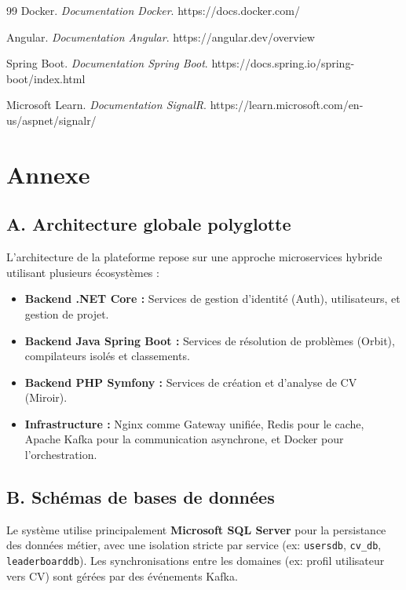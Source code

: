 \documentclass[12pt,a4paper]{report}
\newcommand{\headingfont}{}
\begin{document}
\begin{thebibliography}{99}
		 Docker. \textit{Documentation Docker}. https://docs.docker.com/
		
		 Angular. \textit{Documentation Angular}. https://angular.dev/overview
		
		 Spring Boot. \textit{Documentation Spring Boot}. https://docs.spring.io/spring-boot/index.html
		
		 Microsoft Learn. \textit{Documentation SignalR}. https://learn.microsoft.com/en-us/aspnet/signalr/
		
	\end{thebibliography}
	
    \newpage
    \chapter*{{\headingfont Annexe}}

    \section*{A. Architecture globale polyglotte}
    L'architecture de la plateforme repose sur une approche microservices hybride utilisant plusieurs écosystèmes :
    \begin{itemize}
        \item \textbf{Backend .NET Core :} Services de gestion d'identité (Auth), utilisateurs, et gestion de projet.
        \item \textbf{Backend Java Spring Boot :} Services de résolution de problèmes (Orbit), compilateurs isolés et classements.
        \item \textbf{Backend PHP Symfony :} Services de création et d'analyse de CV (Miroir).
        \item \textbf{Infrastructure :} Nginx comme Gateway unifiée, Redis pour le cache, Apache Kafka pour la communication asynchrone, et Docker pour l'orchestration.
    \end{itemize}

    \section*{B. Schémas de bases de données}
    Le système utilise principalement \textbf{Microsoft SQL Server} pour la persistance des données métier, avec une isolation stricte par service (ex: \texttt{usersdb}, \texttt{cv\_db}, \texttt{leaderboarddb}). Les synchronisations entre les domaines (ex: profil utilisateur vers CV) sont gérées par des événements Kafka.
\end{document}
